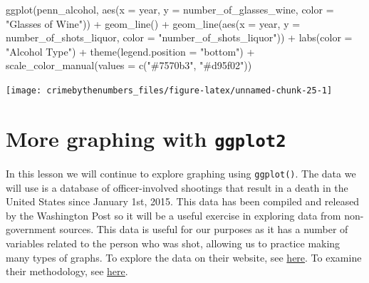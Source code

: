 \documentclass[
  12pt,
  openany]{book}
\newenvironment{Shaded}{\begin{snugshade}}{\end{snugshade}}
\newcommand{\AttributeTok}[1]{\textcolor[rgb]{0.61,0.61,0.61}{#1}}
\newcommand{\FunctionTok}[1]{\textcolor[rgb]{0,0,0}{#1}}
\newcommand{\NormalTok}[1]{#1}
\newcommand{\SpecialCharTok}[1]{\textcolor[rgb]{0,0,0}{#1}}
\newcommand{\StringTok}[1]{\textcolor[rgb]{0.5,0.5,0.5}{#1}}
\begin{document}
\begin{Shaded}
\begin{Highlighting}[]
\FunctionTok{ggplot}\NormalTok{(penn\_alcohol, }\FunctionTok{aes}\NormalTok{(}\AttributeTok{x =}\NormalTok{ year, }\AttributeTok{y =}\NormalTok{ number\_of\_glasses\_wine,}
                         \AttributeTok{color =} \StringTok{"Glasses of Wine"}\NormalTok{)) }\SpecialCharTok{+}
  \FunctionTok{geom\_line}\NormalTok{() }\SpecialCharTok{+}
  \FunctionTok{geom\_line}\NormalTok{(}\FunctionTok{aes}\NormalTok{(}\AttributeTok{x =}\NormalTok{ year, }\AttributeTok{y =}\NormalTok{ number\_of\_shots\_liquor,}
                \AttributeTok{color =} \StringTok{"number\_of\_shots\_liquor"}\NormalTok{)) }\SpecialCharTok{+}
  \FunctionTok{labs}\NormalTok{(}\AttributeTok{color =} \StringTok{"Alcohol Type"}\NormalTok{) }\SpecialCharTok{+}
  \FunctionTok{theme}\NormalTok{(}\AttributeTok{legend.position =} \StringTok{"bottom"}\NormalTok{) }\SpecialCharTok{+}
  \FunctionTok{scale\_color\_manual}\NormalTok{(}\AttributeTok{values =} \FunctionTok{c}\NormalTok{(}\StringTok{"\#7570b3"}\NormalTok{, }\StringTok{"\#d95f02"}\NormalTok{))}
\end{Highlighting}
\end{Shaded}

\begin{center}\texttt{[image: crimebythenumbers\_files/figure-latex/unnamed-chunk-25-1]} \end{center}

\hypertarget{ois_graphs}{%
\chapter{\texorpdfstring{More graphing with \texttt{ggplot2}}{More graphing with ggplot2}}\label{ois_graphs}}

In this lesson we will continue to explore graphing using \texttt{ggplot()}. The data we will use is a database of officer-involved shootings that result in a death in the United States since January 1st, 2015. This data has been compiled and released by the Washington Post so it will be a useful exercise in exploring data from non-government sources. This data is useful for our purposes as it has a number of variables related to the person who was shot, allowing us to practice making many types of graphs.
To explore the data on their website, see \href{https://www.washingtonpost.com/graphics/2019/national/police-shootings-2019/?utm_term=.e870afc9a00c}{here}.
To examine their methodology, see \href{https://www.washingtonpost.com/national/how-the-washington-post-is-examining-police-shootings-in-the-united-states/2016/07/07/d9c52238-43ad-11e6-8856-f26de2537a9d_story.html?utm_term=.f07e9800092b}{here}.
\end{document}
